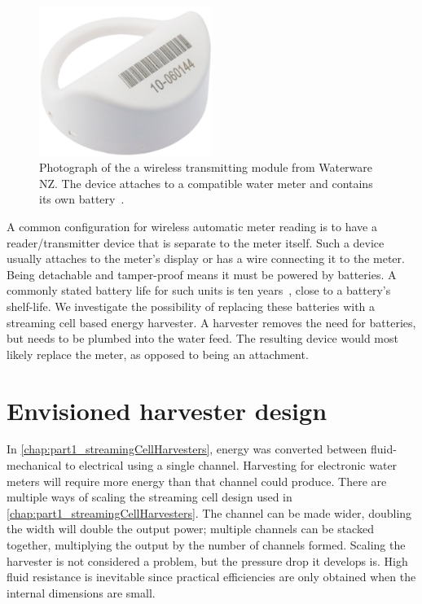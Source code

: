   \begin{figure}
    \centering
    \includegraphics[width=0.5\textwidth]{content/pt1/02-WirelessWaterMeter/graphics/hydro-WMBUSWLESSM}
    \caption{
      \label{fig:Photo_waterwareMeter}
      Photograph of the a wireless transmitting module from Waterware NZ.
      The device attaches to a compatible water meter and contains its own battery~\cite{BMeters2014}.
    }
  \end{figure}
  A common configuration for wireless automatic meter reading is to have a reader/transmitter device that is separate to the meter itself.
  Such a device usually attaches to the meter's display or has a wire connecting it to the meter.
  Being detachable and tamper-proof means it must be powered by batteries.
  A commonly stated battery life for such units is ten years~\cite{BMeters2014}, close to a battery's shelf-life.
  We investigate the possibility of replacing these batteries with a streaming cell based energy harvester.
  A harvester removes the need for batteries, but needs to be plumbed into the water feed.
  The resulting device would most likely replace the meter, as opposed to being an attachment.


  \section{Envisioned harvester design}

    In \cref{chap:part1_streamingCellHarvesters}, energy was converted between fluid-mechanical to electrical using a single channel.
    Harvesting for electronic water meters will require more energy than that channel could produce.
    There are multiple ways of scaling the streaming cell design used in \cref{chap:part1_streamingCellHarvesters}.
    The channel can be made wider, doubling the width will double the output power;
    multiple channels can be stacked together, multiplying the output by the number of channels formed.
    Scaling the harvester is not considered a problem, but the pressure drop it develops is.
    High fluid resistance is inevitable since practical efficiencies are only obtained when the internal dimensions are small.

